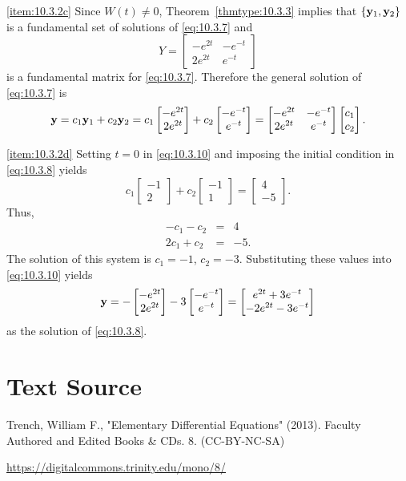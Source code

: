 \documentclass{ximera}
\begin{document}
\begin{example}
\begin{explanation}
\ref{item:10.3.2c} Since $W(t)\ne0$,
Theorem~\ref{thmtype:10.3.3} implies that $\{{\bf y}_1,{\bf y}_2\}$ is
a fundamental set of solutions  of \eqref{eq:10.3.7} and
$$
Y=\begin{bmatrix}-e^{2t}&-e^{-t}\\2e^{2t}&
e^{-t}\end{bmatrix}
$$
is a fundamental matrix for \eqref{eq:10.3.7}.
 Therefore the general
solution of \eqref{eq:10.3.7} is
\begin{equation} \label{eq:10.3.10}
{\bf y}=c_1{\bf y}_1+c_2{\bf y}_2=
c_1\begin{bmatrix} -e^{2t}\\2e^{2t}\end{bmatrix}+c_2\begin{bmatrix}-e^{-t}\\e^{-t}\end{bmatrix}
=\begin{bmatrix}-e^{2t}&-e^{-t}\\2e^{2t}&
e^{-t}\end{bmatrix}
\begin{bmatrix}c_1\\c_2\end{bmatrix}.
\end{equation}

\ref{item:10.3.2d}
Setting $t=0$ in \eqref{eq:10.3.10} and imposing the initial condition
in \eqref{eq:10.3.8} yields
$$
c_1\begin{bmatrix}-1 \\2\end{bmatrix}+c_2
\begin{bmatrix}-1 \\1\end{bmatrix}=
\begin{bmatrix} 4 \\-5\end{bmatrix}.
$$
Thus,
\begin{eqnarray*}
-c_1-c_2&=&4 \\
2c_1+c_2&=&-5.
\end{eqnarray*}
The solution of this system is $c_1=-1$, $c_2=-3$.  Substituting these
values into  \eqref{eq:10.3.10} yields
$$
{\bf y}=-\begin{bmatrix}-e^{2t} \\ 2e^{2t}\end{bmatrix}-3
\begin{bmatrix}-e^{-t} \\ e^{-t}\end{bmatrix}=
\begin{bmatrix} e^{2t}+3e^{-t} \\-2e^{2t}-3e^{-t}
\end{bmatrix}
$$
as the solution of  \eqref{eq:10.3.8}.
\end{explanation}
\end{example}


\section*{Text Source}
Trench, William F., "Elementary Differential Equations" (2013). Faculty Authored and Edited Books \& CDs. 8. (CC-BY-NC-SA)

\href{https://digitalcommons.trinity.edu/mono/8/}{https://digitalcommons.trinity.edu/mono/8/}
\end{document}
